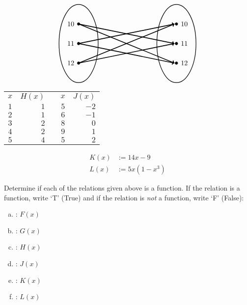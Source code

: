 \documentclass[12pt,letterpaper]{exam}
\begin{document}
\begin{questions}
\[\begin{tikzpicture}
	\draw[line width=0.03cm] (0,0) circle (1 and 2);
	\draw[line width=0.03cm] (5,0) circle (1 and 2);
	
	\draw[fill=black] (0,1) circle (0.07);
	\draw[fill=black] (0,0) circle (0.07);
	\draw[fill=black] (0,-1) circle (0.07);
	
	\draw[fill=black] (5,1) circle (0.07);
	\draw[fill=black] (5,0) circle (0.07);
	\draw[fill=black] (5,-1) circle (0.07);
	
	\draw[line width=0.04cm,->] (0,1) -- (4.9,0);
	\draw[line width=0.04cm,->] (0,1) -- (4.9,-1);
	\draw[line width=0.04cm,->] (0,0) -- (4.9,1);
	\draw[line width=0.04cm,->] (0,0) -- (4.9,-1);
	\draw[line width=0.04cm,->] (0,-1) -- (4.9,1);
	\draw[line width=0.04cm,->] (0,-1) -- (4.9,0);
	
	\node at (-0.4,1) {$10$};
	\node at (-0.4,0) {$11$};
	\node at (-0.4,-1) {$12$};
	
	\node at (5.4,1) {$10$};
	\node at (5.4,0) {$11$};
	\node at (5.4,-1) {$12$};
	\end{tikzpicture}
	\] \pspace

	\begin{minipage}[b]{0.49\textwidth}
	\centering
	\begin{tabular}{c|rcc|r}
	$x$ & $H(x)$ & \hspace{1cm} & $x$ & $J(x)$ \\ \cline{1-2} \cline{4-5}
	$1$ & $1$ & & $5$ & $-2$ \\
	$2$ & $1$ & & $6$ & $-1$ \\
	$3$ & $2$ & & $8$ & $0$ \\
	$4$ & $2$ & & $9$ & $1$ \\
	$5$ & $4$ & & $5$ & $2$
	\end{tabular}
	\end{minipage}
	\begin{minipage}[b]{0.49\textwidth}
	\[
	\begin{aligned}
	K(x)&:= 14x - 9 \\[0.6cm]
	L(x)&:= 5x(1 - x^3)
	\end{aligned}
	\]
	\end{minipage} \pvspace{0.6cm}
	
Determine if each of the relations given above is a function. If the relation is a function, write `T' (True) and if the relation is \emph{not} a function, write `F' (False): \pspace

	\begin{enumerate}[(a)]
	\item \uans{1.6cm}: $F(x)$ \pvspace{0.3cm}
	\item \uans{1.6cm}: $G(x)$ \pvspace{0.3cm}
	\item \uans{1.6cm}: $H(x)$ \pvspace{0.3cm}
	\item \uans{1.6cm}: $J(x)$ \pvspace{0.3cm}
	\item \uans{1.6cm}: $K(x)$ \pvspace{0.3cm}
	\item \uans{1.6cm}: $L(x)$
	\end{enumerate}




\end{questions}
\end{document}
